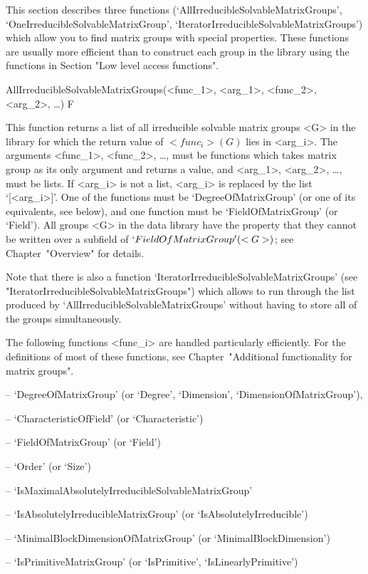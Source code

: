 
This section describes three functions
(`AllIrreducibleSolvableMatrixGroups',
`OneIrreducibleSolvableMatrixGroup',
`IteratorIrreducibleSolvableMatrixGroups') which allow you to find matrix
groups with special properties. These functions are usually more efficient
than to construct each group in the library using the functions in Section
"Low level access functions".

\>AllIrreducibleSolvableMatrixGroups(<func_1>, <arg_1>, <func_2>, <arg_2>, \dots) F

This function returns a list of all irreducible solvable matrix
groups <G> in the {\IRREDSOL} library for which the return value of $<func_i>(G)$ lies in
<arg_i>.  The arguments <func_1>, <func_2>, \dots,
must be {\GAP} functions which takes matrix group as its only argument and returns a
value, and <arg_1>, <arg_2>,
\dots,  must be lists. If <arg_i> is not a list, <arg_i> is replaced by the list
`[<arg_i>]'. One of the functions must be `DegreeOfMatrixGroup' (or one of its
equivalents, see below), and one function must be  `FieldOfMatrixGroup' (or `Field'). All
groups <G> in the data library have the property that they cannot be written over a
subfield of $`FieldOfMatrixGroup'(<G>)$; see Chapter~"Overview" for details. 

Note that there is also a function `IteratorIrreducibleSolvableMatrixGroups' (see
"IteratorIrreducibleSolvableMatrixGroups") which allows to run through the list produced by
`AllIrreducibleSolvableMatrixGroups' without having to store all of the groups
simultaneously.

The following functions <func_i> are handled particularly efficiently. For the
definitions of most of these functions, see Chapter~"Additional functionality for matrix
groups".

\beginlist

\item{--} `DegreeOfMatrixGroup' (or `Degree', `Dimension', `DimensionOfMatrixGroup'), 
\item{--} `CharacteristicOfField' (or `Characteristic')
\item{--} `FieldOfMatrixGroup' (or `Field')
\item{--} `Order' (or `Size')
\item{--} `IsMaximalAbsolutelyIrreducibleSolvableMatrixGroup' 
\item{--} `IsAbsolutelyIrreducibleMatrixGroup' (or `IsAbsolutelyIrreducible')
\item{--} `MinimalBlockDimensionOfMatrixGroup' (or `MinimalBlockDimension')
\item{--} `IsPrimitiveMatrixGroup' (or `IsPrimitive', `IsLinearlyPrimitive')

